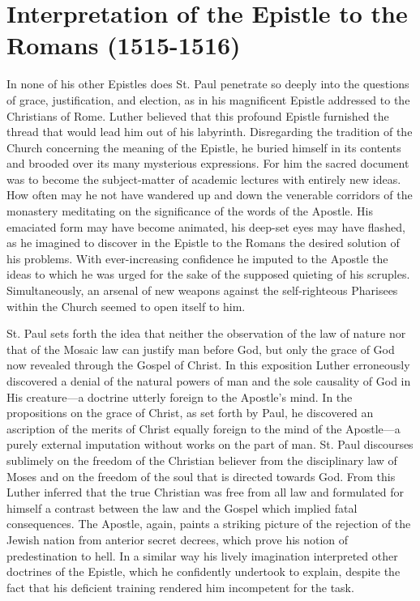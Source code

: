 \section{Interpretation of the Epistle to the Romans (1515-1516)}

In none of his other Epistles does St. Paul penetrate so deeply into
the questions of grace, justification, and election, as in his magnificent
Epistle addressed to the Christians of Rome. Luther believed
that this profound Epistle furnished the thread that would lead him
out of his labyrinth. Disregarding the tradition of the Church concerning
the meaning of the Epistle, he buried himself in its contents
and brooded over its many mysterious expressions. For him the
sacred document was to become the subject-matter of academic
lectures with entirely new ideas. How often may he not have
wandered up and down the venerable corridors of the monastery
meditating on the significance of the words of the Apostle. His
emaciated form may have become animated, his deep-set eyes may
have flashed, as he imagined to discover in the Epistle to the Romans
the desired solution of his problems. With ever-increasing confidence
he imputed to the Apostle the ideas to which he was urged for the
sake of the supposed quieting of his scruples. Simultaneously, an
arsenal of new weapons against the self-righteous Pharisees within
the Church seemed to open itself to him.

St. Paul sets forth the idea that neither the observation of the law
of nature nor that of the Mosaic law can justify man before God,
but only the grace of God now revealed through the Gospel of
Christ. In this exposition Luther erroneously discovered a denial
of the natural powers of man and the sole causality of God in His
creature—a doctrine utterly foreign to the Apostle’s mind. In the
propositions on the grace of Christ, as set forth by Paul, he discovered
an ascription of the merits of Christ equally foreign to the
mind of the Apostle—a purely external imputation without works
on the part of man. St. Paul discourses sublimely on the freedom of
the Christian believer from the disciplinary law of Moses and on the
freedom of the soul that is directed towards God. From this Luther
inferred that the true Christian was free from all law and formulated
for himself a contrast between the law and the Gospel which implied
fatal consequences. The Apostle, again, paints a striking picture of
the rejection of the Jewish nation from anterior secret decrees, which
prove his notion of predestination to hell. In a similar way his lively
imagination interpreted other doctrines of the Epistle, which he
confidently undertook to explain, despite the fact that his deficient
training rendered him incompetent for the task.

